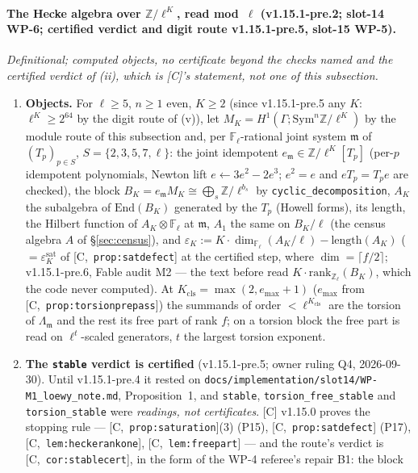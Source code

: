 \documentclass[11pt]{article}
\theoremstyle{remark}
\newcommand{\F}{\mathbb{F}}
\newcommand{\Z}{\mathbb{Z}}
\newcommand{\Sym}{\mathrm{Sym}}
\newcommand{\End}{\mathrm{End}}
\newcommand{\Ga}{\Gamma}
\newcommand{\Fl}{\F_\ell}
\newcommand{\m}{\mathfrak{m}}
\newcommand{\HA}[1]{[C,~\texttt{#1}]}      %
\begin{document}
\paragraph{The Hecke algebra over $\Z/\ell^{K}$, read mod~$\ell$ (v1.15.1-pre.2; slot-14 WP-6; certified verdict and digit route v1.15.1-pre.5, slot-15 WP-5).}
\emph{Definitional; computed objects, no certificate beyond the checks named and the certified verdict of (ii), which is [C]'s statement, not
one of this subsection.}
\begin{enumerate}
\item[(i)] \textbf{Objects.} For $\ell\ge5$, $n\ge1$ even, $K\ge2$ (since v1.15.1-pre.5 any $K$: $\ell^{K}\ge2^{64}$ by the digit route of (v)), let
  $M_K=H^1(\Ga;\Sym^n\Z/\ell^{K})$ by the module route of this subsection and, per $\Fl$-rational joint system $\m$ of $(T_p)_{p\in S}$, $S=\{2,3,5,7,\ell\}$: the joint idempotent
  $e_\m\in\Z/\ell^{K}[T_p]$ (per-$p$ idempotent polynomials, Newton lift $e\leftarrow3e^2-2e^3$; $e^2=e$ and $eT_p=T_pe$ are checked), the block
  $B_K=e_\m M_K\cong\bigoplus_s\Z/\ell^{b_s}$ by \texttt{cyclic\_decomposition}, $A_K$ the subalgebra of $\End(B_K)$ generated by the $T_p$ (Howell
  forms), its length, the Hilbert function of $A_K\otimes\Fl$ at $\m$, $A_1$ the same on $B_K/\ell$ (the census algebra $A$ of \S\ref{sec:census}), and
  $\varepsilon_K:=K\cdot\dim_{\Fl}(A_K/\ell)-\mathrm{length}(A_K)$ ($=\varepsilon^{\mathrm{sat}}_K$ of \HA{prop:satdefect} at the certified step, where
  $\dim=\lceil f/2\rceil$; v1.15.1-pre.6, Fable audit M2 --- the text before read $K\cdot\mathrm{rank}_{\Z_\ell}(B_K)$, which the code never computed). At $K_{\mathrm{cls}}=\max(2,e_{\max}+1)$ ($e_{\max}$ from \HA{prop:torsionprepass})
  the summands of order $<\ell^{K_{\mathrm{cls}}}$ are the torsion of $\Lambda_\m$ and the rest its free part of rank $f$; on a torsion block the free part is read on
  $\ell^{t}$-scaled generators, $t$ the largest torsion exponent.
\item[(ii)] \textbf{The \texttt{stable} verdict is certified} (v1.15.1-pre.5; owner ruling Q4, 2026-09-30). Until v1.15.1-pre.4 it rested on
  \texttt{docs/implementation/slot14/WP-M1\_loewy\_note.md}, Proposition~1, and \texttt{stable}, \texttt{torsion\_free\_stable} and \texttt{torsion\_stable}
  were \emph{readings, not certificates}. [C] v1.15.0 proves the stopping rule --- \HA{prop:saturation}(3) (P15), \HA{prop:satdefect} (P17),
  \HA{lem:heckerankone}, \HA{lem:freepart} --- and the route's verdict is \HA{cor:stablecert}, in the form of the WP-4 referee's repair B1: the block

\end{enumerate}
\end{document}
